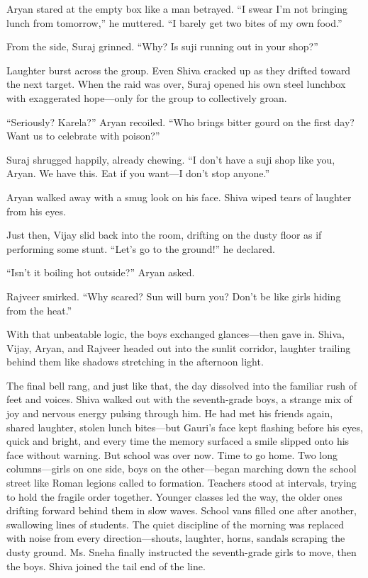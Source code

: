 Aryan stared at the empty box like a man betrayed. ``I swear I'm not bringing lunch from tomorrow,'' he muttered. ``I barely get two bites of my own food.''

From the side, Suraj grinned. ``Why? Is suji running out in your shop?''

Laughter burst across the group. Even Shiva cracked up as they drifted toward the next target. When the raid was over, Suraj opened his own steel lunchbox with exaggerated hope—only for the group to collectively groan.

``Seriously? Karela?'' Aryan recoiled. ``Who brings bitter gourd on the first day? Want us to celebrate with poison?''

Suraj shrugged happily, already chewing. ``I don't have a suji shop like you, Aryan. We have this. Eat if you want—I don't stop anyone.''

Aryan walked away with a smug look on his face. Shiva wiped tears of laughter from his eyes.

Just then, Vijay slid back into the room, drifting on the dusty floor as if performing some stunt. ``Let's go to the ground!'' he declared.

``Isn't it boiling hot outside?'' Aryan asked.

Rajveer smirked. ``Why scared? Sun will burn you? Don't be like girls hiding from the heat.''

With that unbeatable logic, the boys exchanged glances—then gave in. Shiva, Vijay, Aryan, and Rajveer headed out into the sunlit corridor, laughter trailing behind them like shadows stretching in the afternoon light.

The final bell rang, and just like that, the day dissolved into the familiar rush of feet and voices. Shiva walked out with the seventh-grade boys, a strange mix of joy and nervous energy pulsing through him. He had met his friends again, shared laughter, stolen lunch bites—but Gauri's face kept flashing before his eyes, quick and bright, and every time the memory surfaced a smile slipped onto his face without warning. But school was over now. Time to go home. Two long columns—girls on one side, boys on the other—began marching down the school street like Roman legions called to formation. Teachers stood at intervals, trying to hold the fragile order together. Younger classes led the way, the older ones drifting forward behind them in slow waves. School vans filled one after another, swallowing lines of students. The quiet discipline of the morning was replaced with noise from every direction—shouts, laughter, horns, sandals scraping the dusty ground. Ms. Sneha finally instructed the seventh-grade girls to move, then the boys. Shiva joined the tail end of the line.

